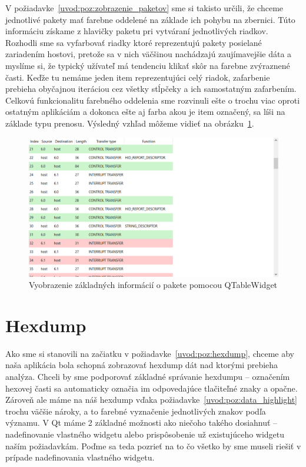 V požiadavke~\ref{uvod:poz:zobrazenie_paketov} sme si takisto určili, že chceme jednotlivé pakety mať farebne oddelené na základe ich pohybu na zbernici. Túto informáciu získame z hlavičky paketu pri vytváraní jednotlivých riadkov. Rozhodli sme sa vyfarbovať riadky ktoré reprezentujú pakety posielané zariadením hostovi, pretože sa v nich väčšinou nachádzajú zaujímavejšie dáta a myslíme si, že typický užívateľ má tendenciu klikať skôr na farebne zvýraznené časti. Keďže tu nemáme jeden item reprezentujúci celý riadok, zafarbenie prebieha obyčajnou iteráciou cez všetky stĺpčeky a ich samostatným zafarbením. Celkovú funkcionalitu farebného oddelenia sme rozvinuli ešte o trochu viac oproti ostatným aplikáciám a dokonca ešte aj farba akou je item označený, sa líši na základe typu prenosu. Výsledný vzhľad môžeme vidieť na obrázku~\ref{obr:kap3:TableViewLookColor}.

\begin{figure}[!htb]
	\centering
	\includegraphics[width=\textwidth]{img/kap03_TableViewLookColor}
	\caption{Vyobrazenie základných informácií o pakete pomocou QTableWidget}
	\label{obr:kap3:TableViewLookColor}
\end{figure}



\section{Hexdump}
Ako sme si stanovili na začiatku v požiadavke~\ref{uvod:poz:hexdump}, chceme aby naša aplikácia bola schopná zobrazovať hexdump dát nad ktorými prebieha analýza. Chceli by sme podporovať základné správanie hexdumpu -- označením hexovej časti sa automaticky označia im odpovedajúce tlačiteľné znaky a opačne. Zároveň ale máme na náš hexdump vďaka požiadavke~\ref{uvod:poz:data_highlight} trochu väčšie nároky, a to farebné vyznačenie jednotlivých znakov podľa významu. V Qt máme 2 základné možnosti ako niečoho takého dosiahnuť -- nadefinovanie vlastného widgetu alebo prispôsobenie už existujúceho widgetu naším požiadavkám. Poďme sa teda pozrieť na to čo všetko by sme museli riešiť v prípade nadefinovania vlastného widgetu.

